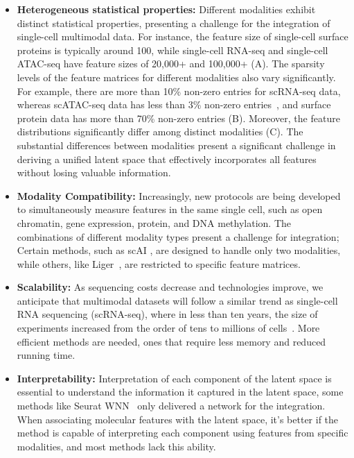 \begin{itemize}
	\item \textbf{Heterogeneous statistical properties:}
	Different modalities exhibit distinct statistical properties, presenting a challenge for the integration of single-cell multimodal data. For instance, the feature size of single-cell surface proteins is typically around 100, while single-cell RNA-seq and single-cell ATAC-seq have feature sizes of 20,000+ and 100,000+ (A). The sparsity levels of the feature matrices for different modalities also vary significantly. For example, there are more than 10\% non-zero entries for scRNA-seq data, whereas scATAC-seq data has less than 3\% non-zero entries~\citep{li2021chromatin}, and surface protein data has more than 70\% non-zero entries (B). Moreover, the feature distributions significantly differ among distinct modalities (C). The substantial differences between modalities present a significant challenge in deriving a unified latent space that effectively incorporates all features without losing valuable information.


	\item \textbf{Modality Compatibility:}
	Increasingly, new protocols are being developed to simultaneously measure features in the same single cell, such as open chromatin, gene expression, protein, and DNA methylation. The combinations of different modality types present a challenge for integration; Certain methods, such as scAI \citep{jin2020scai}, are designed to handle only two modalities, while others, like Liger~\citep{kriebel2022uinmf}, are restricted to specific feature matrices.

	\item \textbf{Scalability:}
	As sequencing costs decrease and technologies improve, we anticipate that multimodal datasets will follow a similar trend as single-cell RNA sequencing (scRNA-seq), where in less than ten years, the size of experiments increased from the order of tens to millions of cells~\citep{svensson2018exponential}. More efficient methods are needed, ones that require less memory and reduced running time.

	\item \textbf{Interpretability:}
	Interpretation of each component of the latent space is essential to understand the information it captured in the latent space, some methods like Seurat WNN~\citep{hao2021seurat4} only delivered a network for the integration. When associating molecular features with the latent space, it's better if the method is capable of interpreting each component using features from specific modalities, and most methods lack this ability.


\end{itemize}
